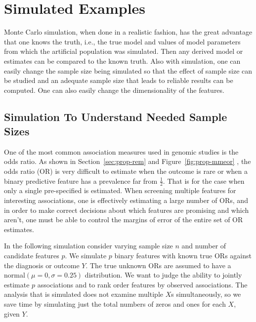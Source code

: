 \section{Simulated Examples}
Monte Carlo simulation, when done in a realistic fashion, has the
great advantage that one knows the truth, i.e., the true model and
values of model parameters from which the artificial population was
simulated.  Then any derived model or estimates can be compared to the
known truth.  Also with simulation, one can easily change the sample
size being simulated so that the effect of sample size can be studied
and an adequate sample size that leads to reliable results can be
computed.  One can also easily change the dimensionality of the features.

\subsection{Simulation To Understand Needed Sample Sizes}
One of the most common association measures used in genomic studies is
the odds ratio.  As shown in Section~\ref{sec:prop-rem} and
Figure~\ref{fig:prop-mmeor} , the odds
ratio (OR) is very difficult to estimate when the outcome is rare or when a
binary predictive feature has a prevalence far from $\frac{1}{2}$.
That is for the case when only a single pre-specified is estimated.
When screening multiple features for interesting associations, one is
effectively estimating a large number of ORs, and in order to make
correct decisions about which features are promising and which aren't,
one must be able to control the margins of error of the entire set of
OR estimates.

In the following simulation consider varying sample size $n$ and
number of candidate features $p$.  We simulate $p$ binary features
with known true ORs against the diagnosis or outcome $Y$.  The
true unknown ORs are assumed to have a normal$(\mu=0,\sigma=0.25)$
distribution.  We want to judge the ability to jointly estimate $p$
associations and to rank order features by observed associations.  The analysis
that is simulated does not examine multiple $X$s simultaneously, so we save time
by simulating just the total numbers of zeros and ones for each $X$, given $Y$.


